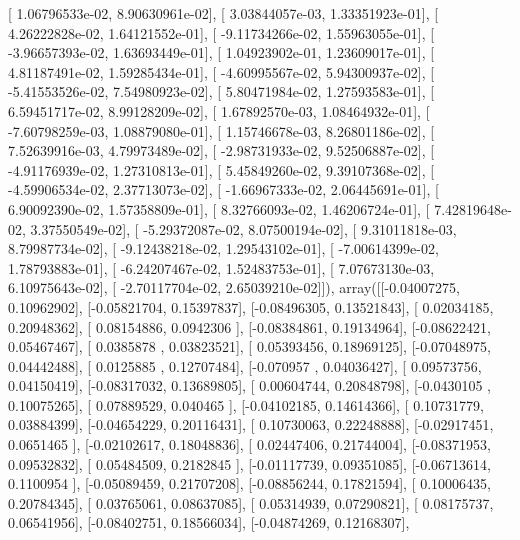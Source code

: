\documentclass{article}
\begin{document}
       [  1.06796533e-02,   8.90630961e-02],
       [  3.03844057e-03,   1.33351923e-01],
       [  4.26222828e-02,   1.64121552e-01],
       [ -9.11734266e-02,   1.55963055e-01],
       [ -3.96657393e-02,   1.63693449e-01],
       [  1.04923902e-01,   1.23609017e-01],
       [  4.81187491e-02,   1.59285434e-01],
       [ -4.60995567e-02,   5.94300937e-02],
       [ -5.41553526e-02,   7.54980923e-02],
       [  5.80471984e-02,   1.27593583e-01],
       [  6.59451717e-02,   8.99128209e-02],
       [  1.67892570e-03,   1.08464932e-01],
       [ -7.60798259e-03,   1.08879080e-01],
       [  1.15746678e-03,   8.26801186e-02],
       [  7.52639916e-03,   4.79973489e-02],
       [ -2.98731933e-02,   9.52506887e-02],
       [ -4.91176939e-02,   1.27310813e-01],
       [  5.45849260e-02,   9.39107368e-02],
       [ -4.59906534e-02,   2.37713073e-02],
       [ -1.66967333e-02,   2.06445691e-01],
       [  6.90092390e-02,   1.57358809e-01],
       [  8.32766093e-02,   1.46206724e-01],
       [  7.42819648e-02,   3.37550549e-02],
       [ -5.29372087e-02,   8.07500194e-02],
       [  9.31011818e-03,   8.79987734e-02],
       [ -9.12438218e-02,   1.29543102e-01],
       [ -7.00614399e-02,   1.78793883e-01],
       [ -6.24207467e-02,   1.52483753e-01],
       [  7.07673130e-03,   6.10975643e-02],
       [ -2.70117704e-02,   2.65039210e-02]]), array([[-0.04007275,  0.10962902],
       [-0.05821704,  0.15397837],
       [-0.08496305,  0.13521843],
       [ 0.02034185,  0.20948362],
       [ 0.08154886,  0.0942306 ],
       [-0.08384861,  0.19134964],
       [-0.08622421,  0.05467467],
       [ 0.0385878 ,  0.03823521],
       [ 0.05393456,  0.18969125],
       [-0.07048975,  0.04442488],
       [ 0.0125885 ,  0.12707484],
       [-0.070957  ,  0.04036427],
       [ 0.09573756,  0.04150419],
       [-0.08317032,  0.13689805],
       [ 0.00604744,  0.20848798],
       [-0.0430105 ,  0.10075265],
       [ 0.07889529,  0.040465  ],
       [-0.04102185,  0.14614366],
       [ 0.10731779,  0.03884399],
       [-0.04654229,  0.20116431],
       [ 0.10730063,  0.22248888],
       [-0.02917451,  0.0651465 ],
       [-0.02102617,  0.18048836],
       [ 0.02447406,  0.21744004],
       [-0.08371953,  0.09532832],
       [ 0.05484509,  0.2182845 ],
       [-0.01117739,  0.09351085],
       [-0.06713614,  0.1100954 ],
       [-0.05089459,  0.21707208],
       [-0.08856244,  0.17821594],
       [ 0.10006435,  0.20784345],
       [ 0.03765061,  0.08637085],
       [ 0.05314939,  0.07290821],
       [ 0.08175737,  0.06541956],
       [-0.08402751,  0.18566034],
       [-0.04874269,  0.12168307],
\end{document}

